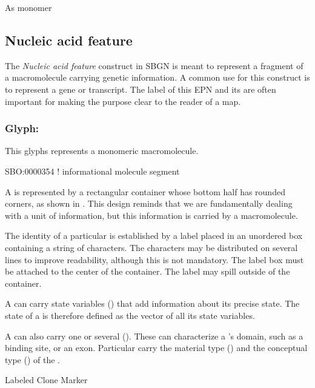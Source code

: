As monomer

\subsection{Nucleic acid feature}
\label{sec:genetic}

The \emph{Nucleic acid feature} construct in SBGN is meant to
represent a fragment of a macromolecule carrying genetic information.
A common use for this construct is to represent a gene or transcript.
The label of this EPN and its  are often
important for making the purpose clear to the reader of a map.

\subsubsection{Glyph: }

This glyphs represents a monomeric macromolecule.

\begin{glyphDescription}

\glyphSboTerm SBO:0000354 !  informational molecule segment

\glyphContainer A  is represented by a rectangular container whose bottom half has rounded corners, as shown in . This design reminds that we are fundamentally dealing with a unit of information, but this information is carried by a macromolecule.

\glyphLabel The identity of a particular  is established by a label placed in an unordered box containing a string of characters.  The characters may be distributed on several lines to improve readability, although this is not mandatory.  The label box must be attached to the center of the container.  The label may spill outside of the container.

\glyphAux A  can carry state variables () that add information about its precise state.  The state of a  is therefore defined as the vector of all its state variables. 

A  can also carry one or several  ().  These can characterize a 's domain, such as a binding site, or an exon.  Particular  carry the material type () and the conceptual type () of the . 

\glyphCloning Labeled Clone Marker

\end{glyphDescription}


